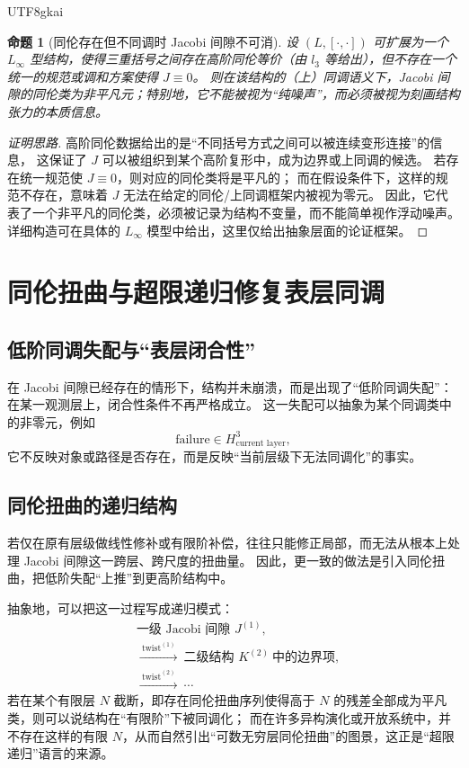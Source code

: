 \documentclass[12pt]{article}
\newtheorem{proposition}{命题}[section]
\begin{document}
\begin{CJK*}{UTF8}{gkai}
\begin{proposition}[同伦存在但不同调时 Jacobi 间隙不可消]
设 $(L,[\cdot,\cdot])$ 可扩展为一个 $L_\infty$ 型结构，使得三重括号之间存在高阶同伦等价（由 $l_3$ 等给出），但不存在一个统一的规范或调和方案使得 $J\equiv 0$。
则在该结构的（上）同调语义下，Jacobi 间隙的同伦类为非平凡元；特别地，它不能被视为“纯噪声”，而必须被视为刻画结构张力的本质信息。
\end{proposition}

\begin{proof}[证明思路]
高阶同伦数据给出的是“不同括号方式之间可以被连续变形连接”的信息，
这保证了 $J$ 可以被组织到某个高阶复形中，成为边界或上同调的候选。
若存在统一规范使 $J\equiv 0$，则对应的同伦类将是平凡的；
而在假设条件下，这样的规范不存在，意味着 $J$ 无法在给定的同伦/上同调框架内被视为零元。
因此，它代表了一个非平凡的同伦类，必须被记录为结构不变量，而不能简单视作浮动噪声。
详细构造可在具体的 $L_\infty$ 模型中给出，这里仅给出抽象层面的论证框架。
\end{proof}


\section{同伦扭曲与超限递归修复表层同调}

\subsection{低阶同调失配与“表层闭合性”}

在 Jacobi 间隙已经存在的情形下，结构并未崩溃，而是出现了“低阶同调失配”：在某一观测层上，闭合性条件不再严格成立。
这一失配可以抽象为某个同调类中的非零元，例如
\[
\text{failure}\in H^3_{\text{current layer}},
\]
它不反映对象或路径是否存在，而是反映“当前层级下无法同调化”的事实。

\subsection{同伦扭曲的递归结构}

若仅在原有层级做线性修补或有限阶补偿，往往只能修正局部，而无法从根本上处理 Jacobi 间隙这一跨层、跨尺度的扭曲量。
因此，更一致的做法是引入同伦扭曲，把低阶失配“上推”到更高阶结构中。

抽象地，可以把这一过程写成递归模式：
\begin{align*}
  &\text{一级 Jacobi 间隙 } J^{(1)},\\
  &\xrightarrow{\ \text{twist}^{(1)}\ }\ \text{二级结构 }K^{(2)}\ \text{中的边界项},\\
  &\xrightarrow{\ \text{twist}^{(2)}\ }\ \cdots
\end{align*}
若在某个有限层 $N$ 截断，即存在同伦扭曲序列使得高于 $N$ 的残差全部成为平凡类，则可以说结构在“有限阶”下被同调化；
而在许多异构演化或开放系统中，并不存在这样的有限 $N$，从而自然引出“可数无穷层同伦扭曲”的图景，这正是“超限递归”语言的来源。


\end{CJK*}
\end{document}
